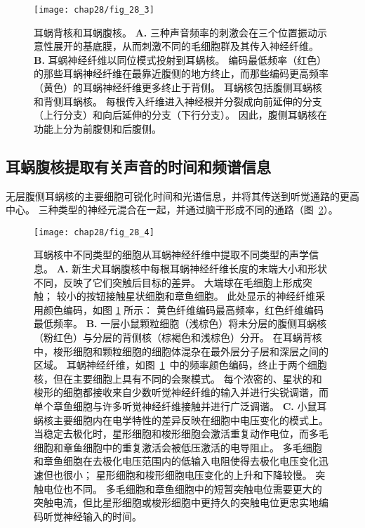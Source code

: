 \begin{figure}[htbp]
	\centering
	\texttt{[image: chap28/fig\_28\_3]}
	\caption{耳蜗背核和耳蜗腹核。
		\textbf{A.} 三种声音频率的刺激会在三个位置振动示意性展开的基底膜，从而刺激不同的毛细胞群及其传入神经纤维。
		\textbf{B.} 耳蜗神经纤维以同位模式投射到耳蜗核。
		编码最低频率（红色）的那些耳蜗神经纤维在最靠近腹侧的地方终止，而那些编码更高频率（黄色）的耳蜗神经纤维更多终止于背侧。
		耳蜗核包括腹侧耳蜗核和背侧耳蜗核。
		每根传入纤维进入神经根并分裂成向前延伸的分支（上行分支）和向后延伸的分支（下行分支）。
		因此，腹侧耳蜗核在功能上分为前腹侧和后腹侧。}
	\label{fig:28_3}
\end{figure}



\subsection{耳蜗腹核提取有关声音的时间和频谱信息}

无层腹侧耳蜗核的主要细胞可锐化时间和光谱信息，并将其传送到听觉通路的更高中心。 
三种类型的神经元混合在一起，并通过脑干形成不同的通路（图~\ref{fig:28_4}）。


\begin{figure}[htbp]
	\centering
	\texttt{[image: chap28/fig\_28\_4]}
	\caption{耳蜗核中不同类型的细胞从耳蜗神经纤维中提取不同类型的声学信息。
		\textbf{A.} 新生犬耳蜗腹核中每根耳蜗神经纤维长度的末端大小和形状不同，反映了它们突触后目标的差异。 
		大端球在毛细胞上形成突触； 
		较小的按钮接触星状细胞和章鱼细胞。 
		此处显示的神经纤维采用颜色编码，如图 \ref{fig:28_3} 所示：
		黄色纤维编码最高频率，红色纤维编码最低频率\cite{y1909histologie}。
		\textbf{B.} 一层小鼠颗粒细胞（浅棕色）将未分层的腹侧耳蜗核（粉红色）与分层的背侧核（棕褐色和浅棕色）分开。 
		在耳蜗背核中，梭形细胞和颗粒细胞的细胞体混杂在最外层分子层和深层之间的区域。
		耳蜗神经纤维，如图~\ref{fig:28_3}~中的频率颜色编码，终止于两个细胞核，但在主要细胞上具有不同的会聚模式。
		每个浓密的、星状的和梭形的细胞都接收来自少数听觉神经纤维的输入并进行尖锐调谐，而单个章鱼细胞与许多听觉神经纤维接触并进行广泛调谐。
		\textbf{C.} 小鼠耳蜗核主要细胞内在电学特性的差异反映在细胞中电压变化的模式上。
		当稳定去极化时，星形细胞和梭形细胞会激活重复动作电位，而多毛细胞和章鱼细胞中的重复激活会被低压激活的电导阻止。
		多毛细胞和章鱼细胞在去极化电压范围内的低输入电阻使得去极化电压变化迅速但也很小； 
		星形细胞和梭形细胞电压变化的上升和下降较慢。
		突触电位也不同。
		多毛细胞和章鱼细胞中的短暂突触电位需要更大的突触电流，但比星形细胞或梭形细胞中更持久的突触电位更忠实地编码听觉神经输入的时间。}
	\label{fig:28_4}
\end{figure}


